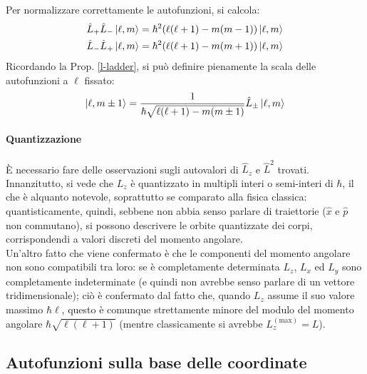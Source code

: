 Per normalizzare correttamente le autofunzioni, si calcola:
\begin{equation*}
	\begin{split}
		&\hat{L}_+\hat{L}_- \ket{\ell,m} = \hbar^2 (\ell(\ell + 1) - m(m - 1)) \ket{\ell,m}\\
		&\hat{L}_-\hat{L}_+ \ket{\ell,m} = \hbar^2 (\ell(\ell + 1) - m(m + 1)) \ket{\ell,m}
	\end{split}
\end{equation*}
Ricordando la Prop. \ref{l-ladder}, si può definire pienamente la scala delle autofunzioni a $ \ell $ fissato:
\begin{equation}
	\ket{\ell,m \pm 1} = \frac{1}{\hbar \sqrt{\ell(\ell + 1) - m(m \pm 1)}} \hat{L}_{\pm} \ket{\ell,m}
	\label{eq:2.21}
\end{equation}

\paragraph{Quantizzazione}

È necessario fare delle osservazioni sugli autovalori di $ \hat{L}_z $ e $ \hat{L}^2 $ trovati. Innanzitutto, si vede che $ L_z $ è quantizzato in multipli interi o semi-interi di $ \hbar $, il che è alquanto notevole, soprattutto se comparato alla fisica classica: quantisticamente, quindi, sebbene non abbia senso parlare di traiettorie ($ \hat{x} $ e $ \hat{p} $ non commutano), si possono descrivere le orbite quantizzate dei corpi, corrispondendi a valori discreti del momento angolare.\\
Un'altro fatto che viene confermato è che le componenti del momento angolare non sono compatibili tra loro: se è completamente determinata $ L_z $, $ L_x $ ed $ L_y $ sono completamente indeterminate (e quindi non avrebbe senso parlare di un vettore tridimensionale); ciò è confermato dal fatto che, quando $ L_z $ assume il suo valore massimo $ \hbar \ell $, questo è comunque strettamente minore del modulo del momento angolare $ \hbar \sqrt{\ell(\ell + 1)} $ (mentre classicamente si avrebbe $ L_z^{(\text{max})} = L $).

\subsection{Autofunzioni sulla base delle coordinate}

